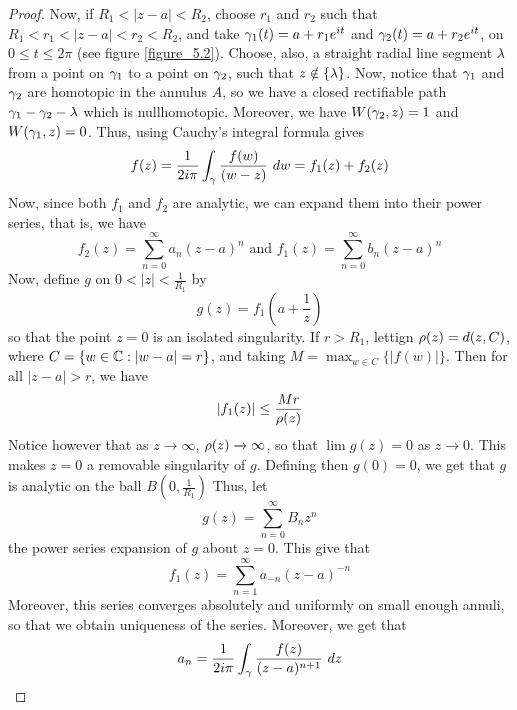 \begin{proof}
    Now, if $R_1<|z-a|<R_2$, choose $r_1$ and $r_2$ such that
    $R_1<r_1<|z-a|<r_2<R_2$, and take $\gamma_1(t)=a+r_1e^{it}$ and
    $\gamma_2(t)=a+r_2e^{it}$, on $0 \leq t \leq 2\pi$ (see figure
    \ref{figure_5.2}). Choose, also, a straight radial line segment $\lambda$ from a
    point on $\gamma_1$ to a point on $\gamma_2$, such that $z \notin \{\lambda\}$. Now,
    notice that $\gamma_1$ and $\gamma_2$ are homotopic in the annulus $A$, so we have a
    closed rectifiable path  $\gamma_1-\gamma_2-\lambda$ which is nullhomotopic. Moreover, we
    have $W(\gamma_2,z)=1$ and $W(\gamma_1,z)=0$. Thus, using Cauchy's integral formula
    gives
    \begin{equation*}
        f(z)=\frac{1}{2i\pi}\int_{\gamma}{\frac{f(w)}{(w-z)} \ dw}=f_1(z)+f_2(z)
    \end{equation*}
    Now, since both $f_1$ and $f_2$ are analytic, we can expand them into their
    power series, that is, we have
    \begin{equation*}
        f_2(z)=\sum_{n=0}^\infty{a_n(z-a)^n} \text{ and }
        f_1(z)=\sum_{n=0}^\infty{b_n(z-a)^n}
    \end{equation*}
    Now, define $g$ on  $0<|z|<\frac{1}{R_1}$ by
    \begin{equation*}
        g(z)=f_1(a+\frac{1}{z})
    \end{equation*}
    so that the point $z=0$ is an isolated singularity. If  $r>R_1$, lettign
    $\rho(z)=d(z,C)$, where $C=\{w \in \mathbb{C} : |w-a|=r\}$, and taking $M=\max_{w \in
    C}{\{|f(w)|\}}$. Then for all $|z-a|>r$, we have
    \begin{equation*}
        |f_1(z)| \leq \frac{Mr}{\rho(z)}
    \end{equation*}
    Notice however that as $z \xrightarrow{} \infty$, $\rho(z) \xrightarrow{}
    \infty$, so that $\lim{g(z)}=0$ as $z \xrightarrow{} 0$. This makes $z=0$ a
    removable singularity of $g$. Defining then  $g(0)=0$, we get that $g$ is
    analytic on the ball  $B(0,\frac{1}{R_1})$ Thus, let
    \begin{equation*}
        g(z)=\sum_{n=0}^\infty{B_nz^n}
    \end{equation*}
    the power series expansion of $g$ about  $z=0$. This give that
    \begin{equation*}
        f_1(z)=\sum_{n=1}^\infty{a_{-n}(z-a)^{-n}}
    \end{equation*}
    Moreover, this series converges absolutely and uniformly on small enough
    annuli, so that we obtain uniqueness of the series. Moreover, we get that
    \begin{equation*}
        a_n=\frac{1}{2i\pi}\int_\gamma{\frac{f(z)}{(z-a)^{n+1}} \ dz}
    \end{equation*}
\end{proof}
